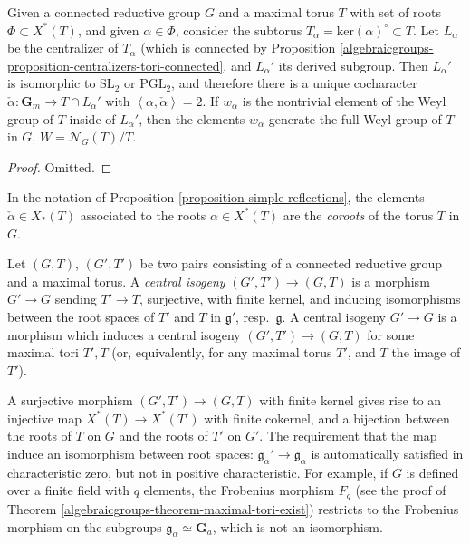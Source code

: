 \begin{proposition}
\label{proposition-simple-reflections}
 Given a connected reductive group $G$ and a maximal torus $T$ with set of roots $\Phi\subset X^*(T)$, and given $\alpha\in \Phi$, consider the subtorus $T_\alpha=\text{ker}(\alpha)^\circ\subset T$. Let $L_\alpha$ be the centralizer of $T_\alpha$ (which is connected by Proposition \ref{algebraicgroups-proposition-centralizers-tori-connected}, and $L_\alpha'$ its derived subgroup. Then $L_\alpha'$ is isomorphic to $\text{SL}_2$ or $\text{PGL}_2$, and therefore there is a unique cocharacter $\check\alpha:\mathbf G_m\to T\cap L_{\alpha}'$ with $\left< \alpha, \check\alpha\right>=2$. If $w_\alpha$ is the nontrivial element of the Weyl group of $T$ inside of $L_\alpha'$, then the elements $w_\alpha$ generate the full Weyl group of $T$ in $G$, $W = \mathcal N_G(T)/T$.
\end{proposition}

\begin{proof}
 Omitted.
\end{proof}

\begin{definition}
 \label{definition-coroots-group}
In the notation of Proposition \ref{proposition-simple-reflections}, the elements $\check\alpha\in X_*(T)$ associated to the roots $\alpha\in X^*(T)$ are the {\it coroots} of the torus $T$ in $G$.
\end{definition}


\begin{definition}
\label{definition-central-isogeny}
 Let $(G,T)$, $(G',T')$ be two pairs consisting of a connected reductive group and a maximal torus. A {\it central isogeny} $(G',T')\to (G,T)$ is a morphism $G'\to G$ sending $T'\to T$, surjective, with finite kernel, and inducing isomorphisms between the root spaces of $T'$ and $T$ in $\mathfrak g'$, resp.\ $\mathfrak g$. A central isogeny $G'\to G$ is a morphism  which induces a central isogeny $(G',T')\to (G,T)$ for some maximal tori $T', T$ (or, equivalently, for any maximal torus $T'$, and $T$ the image of $T'$). 
\end{definition}

\begin{remark}
 \label{remark-on-central-isogenies}
A surjective morphism $(G',T')\to (G,T)$ with finite kernel gives rise to an injective map $X^*(T)\to X^*(T')$ with finite cokernel, and a bijection between the roots of $T$ on $G$ and the roots of $T'$ on $G'$. The requirement that the map induce an isomorphism between root spaces: $\mathfrak g_\alpha'\to \mathfrak g_\alpha$ is automatically satisfied in characteristic zero, but not in positive characteristic. For example, if $G$ is defined over a finite field with $q$ elements, the Frobenius morphism $F_q$ (see the proof of Theorem \ref{algebraicgroups-theorem-maximal-tori-exist}) restricts to the Frobenius morphism on the subgroups $\mathfrak g_\alpha\simeq \mathbf G_a$, which is not an isomorphism.
\end{remark}



